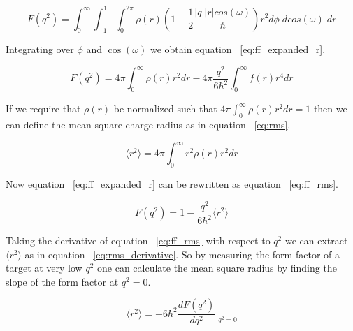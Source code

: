\begin{equation} \label{eq:ff_expanded}
	F(q^2) = \int_0^\infty \int_{-1}^1 \int_0^{2\pi} \rho(r) \left( 1-\frac{1}{2} \frac{|q||r|cos(\omega)}{\hbar} \right) r^2 d\phi \; dcos(\omega) \; dr
\end{equation}

\noindent Integrating over $\phi$ and $\cos(\omega)$ we obtain equation ~\ref{eq:ff_expanded_r}.

\begin{equation} \label{eq:ff_expanded_r}
	F(q^2) = 4\pi \int_0^\infty \rho(r) r^2 dr - 4\pi \frac{q^2}{6\hbar^2} \int_0^\infty f(r) r^4 dr
\end{equation}

If we require that $\rho(r)$ be normalized such that $4\pi \int_0^\infty \rho(r) r^2 dr = 1$ then we can define the mean square charge radius as in equation ~\ref{eq:rms}.

\begin{equation} \label{eq:rms}
	\langle r^2 \rangle = 4\pi \int_0^\infty r^2 \rho(r) r^2 dr
\end{equation}

\noindent Now equation ~\ref{eq:ff_expanded_r} can be rewritten as equation ~\ref{eq:ff_rms}.

\begin{equation} \label{eq:ff_rms}
	F(q^2) = 1 - \frac{q^2}{6\hbar^2} \langle r^2 \rangle
\end{equation}

\noindent Taking the derivative of equation ~\ref{eq:ff_rms} with respect to $q^2$ we can extract $\langle r^2 \rangle$ as in equation ~\ref{eq:rms_derivative}. So by measuring the form factor of a target at very low $q^2$ one can calculate the mean square radius by finding the slope of the form factor at $q^2=0$.

\begin{equation} \label{eq:rms_derivative}
	\langle r^2 \rangle = -6\hbar^2 \frac{dF(q^2)}{dq^2} |_{q^2=0}
\end{equation}
